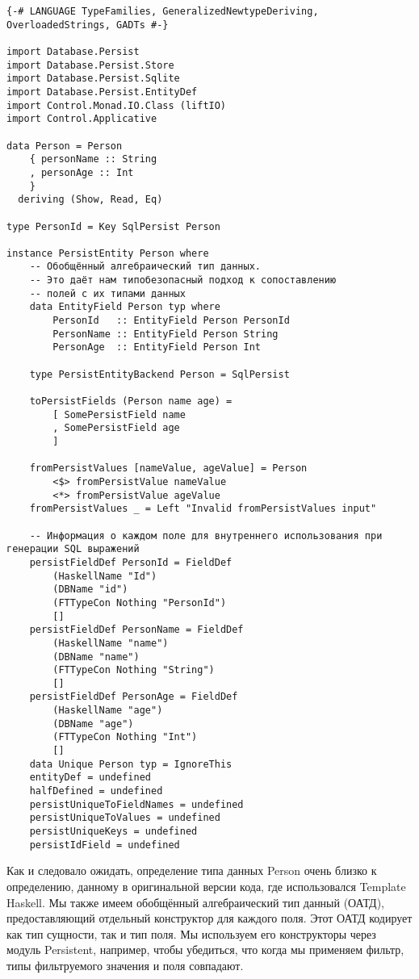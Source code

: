 \begin{lstlisting}
{-# LANGUAGE TypeFamilies, GeneralizedNewtypeDeriving, OverloadedStrings, GADTs #-}

import Database.Persist
import Database.Persist.Store
import Database.Persist.Sqlite
import Database.Persist.EntityDef
import Control.Monad.IO.Class (liftIO)
import Control.Applicative

data Person = Person
    { personName :: String
    , personAge :: Int
    }
  deriving (Show, Read, Eq)

type PersonId = Key SqlPersist Person

instance PersistEntity Person where
    -- Обобщённый алгебраический тип данных.
    -- Это даёт нам типобезопасный подход к сопоставлению
    -- полей с их типами данных
    data EntityField Person typ where
        PersonId   :: EntityField Person PersonId
        PersonName :: EntityField Person String
        PersonAge  :: EntityField Person Int

    type PersistEntityBackend Person = SqlPersist

    toPersistFields (Person name age) =
        [ SomePersistField name
        , SomePersistField age
        ]

    fromPersistValues [nameValue, ageValue] = Person
        <$> fromPersistValue nameValue
        <*> fromPersistValue ageValue
    fromPersistValues _ = Left "Invalid fromPersistValues input"

    -- Информация о каждом поле для внутреннего использования при генерации SQL выражений
    persistFieldDef PersonId = FieldDef
        (HaskellName "Id")
        (DBName "id")
        (FTTypeCon Nothing "PersonId")
        []
    persistFieldDef PersonName = FieldDef
        (HaskellName "name")
        (DBName "name")
        (FTTypeCon Nothing "String")
        []
    persistFieldDef PersonAge = FieldDef
        (HaskellName "age")
        (DBName "age")
        (FTTypeCon Nothing "Int")
        []
    data Unique Person typ = IgnoreThis
    entityDef = undefined
    halfDefined = undefined
    persistUniqueToFieldNames = undefined
    persistUniqueToValues = undefined
    persistUniqueKeys = undefined
    persistIdField = undefined
\end{lstlisting}

Как и следовало ожидать, определение типа данных Person очень близко к определению, данному в оригинальной версии кода, где использовался Template Haskell. Мы также имеем обобщённый алгебраический тип данный (ОАТД), предоставляющий отдельный конструктор для каждого поля. Этот ОАТД кодирует как тип сущности, так и тип поля. Мы используем его конструкторы через модуль Persistent, например, чтобы убедиться, что когда мы применяем фильтр, типы фильтруемого значения и поля совпадают.

